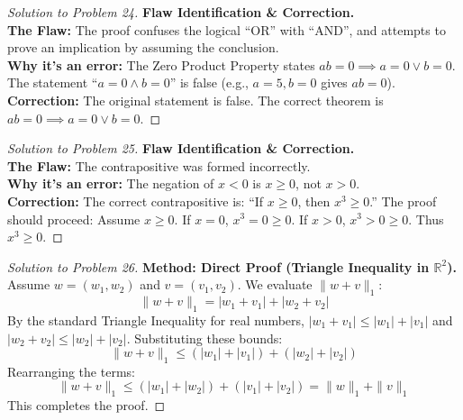 \documentclass[11pt]{article}
\begin{document}
\begin{proof}[Solution to Problem 24]
    \textbf{Flaw Identification \& Correction.} \\
    \textbf{The Flaw:} The proof confuses the logical ``OR'' with ``AND'', and attempts to prove an implication by assuming the conclusion. \\
    \textbf{Why it's an error:} The Zero Product Property states $ab = 0 \implies a = 0 \lor b = 0$. The statement ``$a = 0 \land b = 0$'' is false (e.g., $a=5, b=0$ gives $ab=0$). \\
    \textbf{Correction:} The original statement is false. The correct theorem is $ab = 0 \implies a = 0 \lor b = 0$.
\end{proof}

\begin{proof}[Solution to Problem 25]
    \textbf{Flaw Identification \& Correction.} \\
    \textbf{The Flaw:} The contrapositive was formed incorrectly. \\
    \textbf{Why it's an error:} The negation of $x < 0$ is $x \ge 0$, not $x > 0$. \\
    \textbf{Correction:} The correct contrapositive is: ``If $x \ge 0$, then $x^3 \ge 0$.'' The proof should proceed: Assume $x \ge 0$. If $x = 0$, $x^3 = 0 \ge 0$. If $x > 0$, $x^3 > 0 \ge 0$. Thus $x^3 \ge 0$.
\end{proof}

\begin{proof}[Solution to Problem 26]
    \textbf{Method: Direct Proof (Triangle Inequality in $\mathbb{R}^2$).} \\
    Assume $w = (w_1, w_2)$ and $v = (v_1, v_2)$. We evaluate $\|w + v\|_1$:
    \[ \|w + v\|_1 = |w_1 + v_1| + |w_2 + v_2| \]
    By the standard Triangle Inequality for real numbers, $|w_1 + v_1| \le |w_1| + |v_1|$ and $|w_2 + v_2| \le |w_2| + |v_2|$. Substituting these bounds:
    \[ \|w + v\|_1 \le (|w_1| + |v_1|) + (|w_2| + |v_2|) \]
    Rearranging the terms:
    \[ \|w + v\|_1 \le (|w_1| + |w_2|) + (|v_1| + |v_2|) = \|w\|_1 + \|v\|_1 \]
    This completes the proof.
\end{proof}
\end{document}
